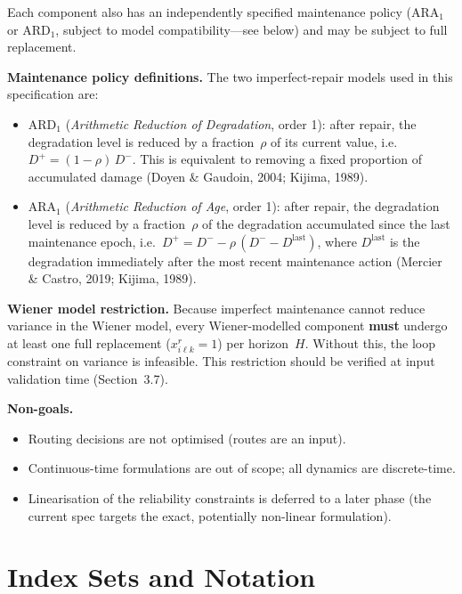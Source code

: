 \documentclass[11pt,a4paper]{article}
\begin{document}
Each component also has an independently specified maintenance policy
($\mathrm{ARA}_1$ or $\mathrm{ARD}_1$, subject to model compatibility---see below)
and may be subject to full replacement.

\textbf{Maintenance policy definitions.}
The two imperfect-repair models used in this specification are:
\begin{itemize}
  \item $\mathrm{ARD}_1$ (\emph{Arithmetic Reduction of Degradation}, order 1):
        after repair, the degradation level is reduced by a fraction~$\rho$ of its
        current value, i.e.\ $D^+ = (1-\rho)\,D^-$.
        This is equivalent to removing a fixed proportion of accumulated damage
        (Doyen \& Gaudoin, 2004; Kijima, 1989).
  \item $\mathrm{ARA}_1$ (\emph{Arithmetic Reduction of Age}, order 1):
        after repair, the degradation level is reduced by a fraction~$\rho$ of the
        degradation accumulated since the last maintenance epoch, i.e.\
        $D^+ = D^- - \rho\,(D^- - D^{\mathrm{last}})$,
        where $D^{\mathrm{last}}$ is the degradation immediately after the most recent
        maintenance action (Mercier \& Castro, 2019; Kijima, 1989).
\end{itemize}

\textbf{Wiener model restriction.}
Because imperfect maintenance cannot reduce variance in the Wiener model, every
Wiener-modelled component \textbf{must} undergo at least one full replacement
($x^r_{i\ell k}=1$) per horizon~$H$. Without this, the loop constraint on variance
is infeasible. This restriction should be verified at input validation time
(Section~3.7).

\textbf{Non-goals.}
\begin{itemize}
  \item Routing decisions are not optimised (routes are an input).
  \item Continuous-time formulations are out of scope; all dynamics are discrete-time.
  \item Linearisation of the reliability constraints is deferred to a later phase
        (the current spec targets the exact, potentially non-linear formulation).
\end{itemize}

\section{Index Sets and Notation}
\end{document}
